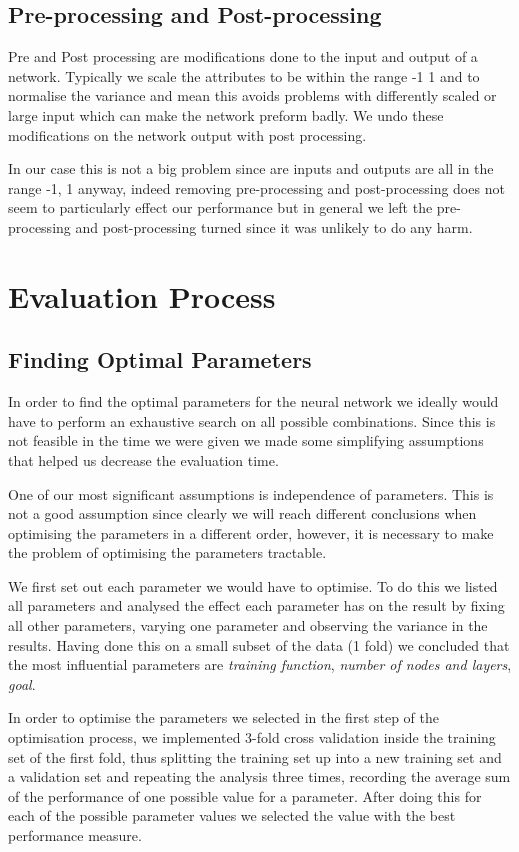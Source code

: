 \documentclass[10pt,a4paper]{article}
\begin{document}
\subsection{Pre-processing and Post-processing}
Pre and Post processing are modifications done to the input and output of a network.
Typically we scale the attributes to be within the range -1 1 and to normalise the variance and mean this avoids problems with differently scaled or large input which can make the network preform badly.
We undo these modifications on the network output with post processing.

In our case this is not a big problem since are inputs and outputs are all in the range -1, 1 anyway, indeed removing pre-processing and post-processing does not seem to particularly effect our performance but in general we left the pre-processing and post-processing turned since it was unlikely to do any harm. 

\section{Evaluation Process}

\subsection{Finding Optimal Parameters}
In order to find the optimal parameters for the neural network we ideally would have to perform an exhaustive search on all possible combinations. Since this is not feasible in the time we were given we made some simplifying assumptions that helped us decrease the evaluation time.

One of our most significant assumptions is independence of parameters. This is not a good assumption since clearly we will reach different conclusions when optimising the parameters in a different order, however, it is necessary to make the problem of optimising the parameters tractable.

We first set out each parameter we would have to optimise. To do this we listed all parameters and analysed the effect each parameter has on the result by fixing all other parameters, varying one parameter and observing the variance in the results. Having done this on a small subset of the data (1 fold) we concluded that the most influential parameters are \emph{training function}, \emph{number of nodes and layers}, \emph{goal}. %

In order to optimise the parameters we selected in the first step of the optimisation process, we implemented 3-fold cross validation inside the training set of the first fold, thus splitting the training set up into a new training set and a validation set and repeating the analysis three times, recording the average sum of the performance of one possible value for a parameter. After doing this for each of the possible parameter values we selected the value with the best performance measure.
\end{document}
